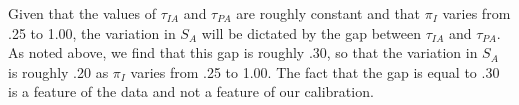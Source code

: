 \documentclass[12pt,english]{article}
\begin{document}
Given that the values of $\tau _{IA}$ and $\tau _{PA}$ are roughly constant
and that $\pi _{I}$ varies from .25 to 1.00, the variation in $S_{A}$ will
be dictated by the gap between $\tau _{IA}$ and $\tau _{PA}$. As noted
above, we find that this gap is roughly $.30$, so that the variation in $%
S_{A}$ is roughly .20 as $\pi _{I}$ varies from .25 to 1.00. The fact that
the gap is equal to $.30$ is a feature of the data and not a feature of our
calibration.
\end{document}
